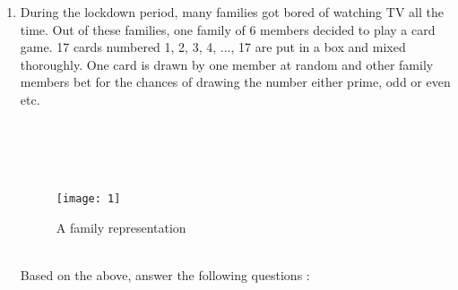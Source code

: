 \begin{enumerate}

\item During the lockdown period, many families got bored of watching TV all the time. Out of these families, one family of 6 members decided to play a card game. 17 cards numbered 1, 2, 3, 4, ..., 17 are put in a box and mixed thoroughly. One card is drawn by one member at random and other family members bet for the chances of drawing the number either prime, odd or even etc. 
\\
\\
\\
\\
\\
  \begin{figure}[h!]
  \centering
  \texttt{[image: 1]}
  \caption{A family representation}
  \label{figs/1.jpg}
  \end{figure} 
\\
Based on the above, answer the following questions : 
		

\end{enumerate}
